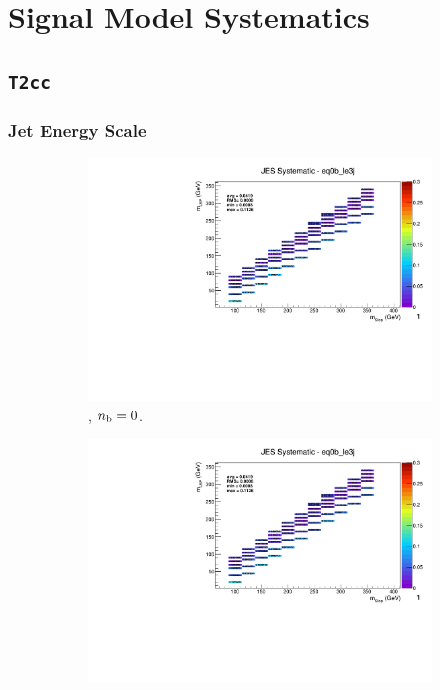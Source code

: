 \chapter{Signal Model Systematics}
\label{ch:app_sig_syst}

\section*{\texttt{T2cc}}
\label{sec:t2cc_syst_plots}

\newpage
\subsection*{Jet Energy Scale}
\label{sec:t2cc_jes_plots}

\begin{figure}[ht!]
  \centering
  \begin{subfigure}[b]{0.32\textwidth}
    \includegraphics[width=\textwidth, page=12]{Figs/sms/t2cc/v37/systs_v2/T2cc_JES_eq0b_le3j.pdf}
    \caption{\njlow, $n_{\text{b}} = 0$.}
  \end{subfigure}
  \begin{subfigure}[b]{0.32\textwidth}
    \includegraphics[width=\textwidth, page=8]{Figs/sms/t2cc/v37/systs_v2/T2cc_JES_eq0b_le3j.pdf}

\end{subfigure}
\end{figure}
